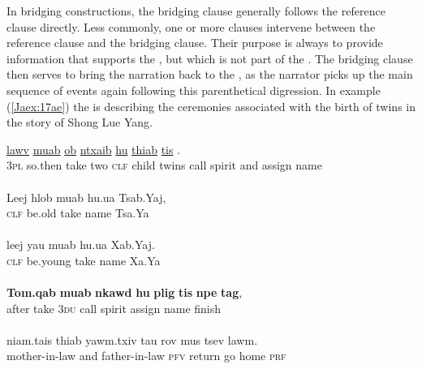 \documentclass[output=paper]{LSP/langsci}
\begin{document}
In  bridging constructions, the bridging clause generally follows the reference clause directly. Less commonly, one or more clauses intervene between the reference clause and the bridging clause. Their purpose is always to provide information that supports the , but which is not part of the . The bridging clause then serves to bring the narration back to the , as the narrator picks up the main sequence of events again following this parenthetical digression. In example (\ref{Jaex:17ae}) the  is describing the ceremonies associated with the birth of twins in the story of Shong Lue Yang.
%
\begin{exe}
\ex \label{Jaex:17ae}
\begin{xlist}
\ex \label{Jaex:17a}
\gll \underline{lawv} \underline{} \underline{muab} \underline{ob} \underline{} \underline{}     \underline{ntxaib} \underline{hu} \underline{} \underline{thiab}     \underline{tis} \underline{}.\\
3\textsc{pl} so.then take two \textsc{clf} child twins call spirit and assign name\\
\glt {}\\
\ex \label{Jaex:17b}
\gll Leej hlob muab hu.ua  Tsab.Yaj,\\
\textsc{clf} be.old take name Tsa.Ya\\ 
\glt {}\\
\ex \label{Jaex:17c}
\gll leej yau  muab hu.ua Xab.Yaj.\\		
 \textsc{clf} be.young take name Xa.Ya \\ 
\glt {}\\
\ex \label{Jaex:17d}
\gll \textbf{Tom.qab} \textbf{muab}  \textbf{nkawd} \textbf{hu} \textbf{plig} \textbf{tis} \textbf{npe} \textbf{tag},\\		           
 after take 3\textsc{du} call spirit assign name finish\\
\glt {}\\
\ex \label{Jaex:17e}
\gll niam.tais thiab yawm.txiv  tau rov mus tsev lawm.\\     	      
mother-in-law and father-in-law \textsc{pfv} return go home \textsc{prf}\\
\glt {} \citep[][33]{vang90}
\end{xlist}
\end{exe}
\end{document}
